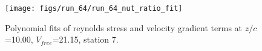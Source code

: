 \begin{figure}[H]
\centering
\texttt{[image: figs/run\_64/run\_64\_nut\_ratio\_fit]}
\caption{Polynomial fits of reynolds stress and velocity gradient terms at $z/c$=10.00, $V_{free}$=21.15, station 7.}
\label{fig:run_64_nut_ratio_fit}
\end{figure}


